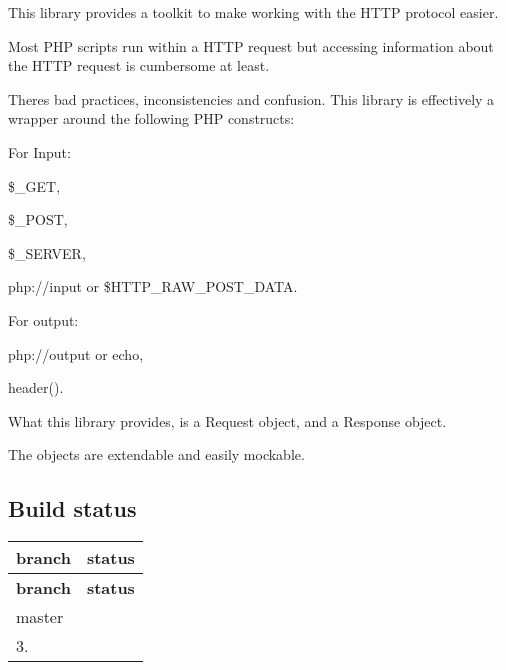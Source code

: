 This library provides a toolkit to make working with the H\+T\+TP protocol easier.

Most P\+HP scripts run within a H\+T\+TP request but accessing information about the H\+T\+TP request is cumbersome at least.

There\textquotesingle{}s bad practices, inconsistencies and confusion. This library is effectively a wrapper around the following P\+HP constructs\+:

For Input\+:


\begin{DoxyItemize}
\item {\ttfamily \$\+\_\+\+G\+ET},
\item {\ttfamily \$\+\_\+\+P\+O\+ST},
\item {\ttfamily \$\+\_\+\+S\+E\+R\+V\+ER},
\item {\ttfamily php\+://input} or {\ttfamily \$\+H\+T\+T\+P\+\_\+\+R\+A\+W\+\_\+\+P\+O\+S\+T\+\_\+\+D\+A\+TA}.
\end{DoxyItemize}

For output\+:


\begin{DoxyItemize}
\item {\ttfamily php\+://output} or {\ttfamily echo},
\item {\ttfamily header()}.
\end{DoxyItemize}

What this library provides, is a {\ttfamily Request} object, and a {\ttfamily Response} object.

The objects are extendable and easily mockable.

\subsection*{Build status }

\tabulinesep=1mm
\begin{longtabu} spread 0pt [c]{*{2}{|X[-1]}|}
\hline
\rowcolor{\tableheadbgcolor}\textbf{ branch  }&\textbf{ status   }\\
\endfirsthead
\hline
\endfoot
\hline
\rowcolor{\tableheadbgcolor}\textbf{ branch  }&\textbf{ status   }\\
\endhead
master  &\href{https://travis-ci.org/fruux/sabre-http}{\tt }   \\
3.  &\href{https://travis-ci.org/fruux/sabre-http}{\tt }   \\
\end{longtabu}


